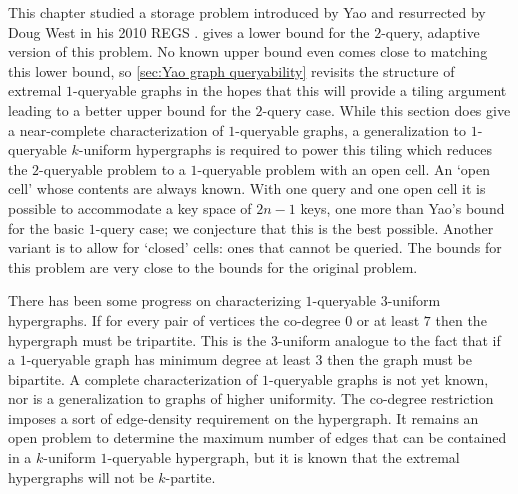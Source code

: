 This chapter studied a storage problem introduced by Yao and resurrected by Doug West in his 2010 REGS \cite{WestYao}.  gives a lower bound for the $2$-query, adaptive version of this problem. No known upper bound even comes close to matching this lower bound, so \autoref{sec:Yao graph queryability} revisits the structure of extremal $1$-queryable graphs in the hopes that this will provide a tiling argument leading to a better upper bound for the $2$-query case. While this section does give a near-complete characterization of $1$-queryable graphs, a generalization to $1$-queryable $k$-uniform hypergraphs\nocite{Berge} is required to power this tiling which reduces the $2$-queryable problem to a $1$-queryable problem with an open cell. An `open cell' whose contents are always known. With one query and one open cell it is possible to accommodate a key space of $2n-1$ keys, one more than Yao's bound for the basic $1$-query case; we conjecture that this is the best possible. Another variant is to allow for `closed' cells: ones that cannot be queried. The bounds for this problem are very close to the bounds for the original problem.

There has been some progress on characterizing $1$-queryable $3$-uniform hypergraphs. If for every pair of vertices the co-degree $0$ or at least $7$ then the hypergraph must be tripartite. This is the $3$-uniform analogue to the fact that if a $1$-queryable graph has minimum degree at least $3$ then the graph must be bipartite. A complete characterization of $1$-queryable graphs is not yet known, nor is a generalization to graphs of higher uniformity. The co-degree restriction imposes a sort of edge-density requirement on the hypergraph. It remains an open problem to determine the maximum number of edges that can be contained in a $k$-uniform $1$-queryable hypergraph, but it is known that the extremal hypergraphs will not be $k$-partite.